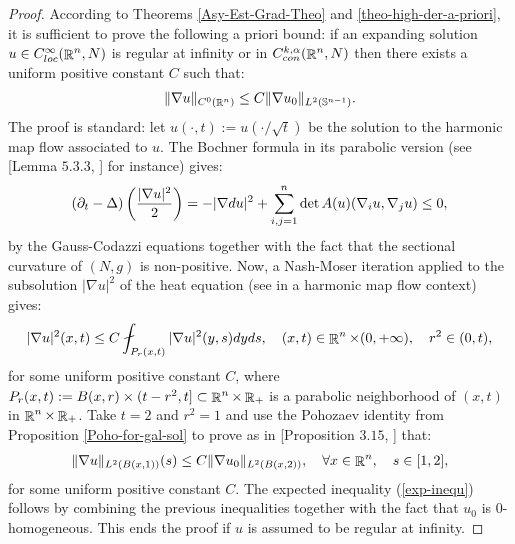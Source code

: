 \documentclass[a4paper,11pt,reqno]{amsart}
\newtheorem{rk}[defn]{Remark}
\def\det{\mathop{\rm det}\nolimits}
\def\det{\mathop{\rm det}\nolimits}
\def\R{\mathop{\rm \mathbb{R}}\nolimits}
\newcommand{\Sp}{\mathbb{S}}
\begin{document}


\begin{proof}
According to Theorems \ref{Asy-Est-Grad-Theo} and \ref{theo-high-der-a-priori}, it is sufficient to prove the following a priori bound: if an expanding solution $u\in C^{\infty}_{loc}(\R^n,N)$ is regular at infinity or in $C^{k,\alpha}_{con}(\R^n,N)$ then there exists a uniform positive constant $C$ such that:
\begin{eqnarray}
\|\nabla u\|_{C^0(\R^n)}\leq C\|\nabla u_0\|_{L^2(\Sp^{n-1})}.\label{exp-inequ}
\end{eqnarray}
The proof is standard: let $u(\cdot,t):=u(\cdot/\sqrt{t})$ be the solution to the harmonic map flow associated to $u$. The Bochner formula in its parabolic version (see [Lemma $5.3.3$, \cite{Lin-Wang-Boo}] for instance) gives:
\begin{eqnarray*}
(\partial_t-\Delta)\left(\frac{|\nabla u|^2}{2}\right)=-|\nabla du|^2+\sum_{i,j=1}^n\det A(u)(\nabla_iu,\nabla_ju)\leq0,
\end{eqnarray*}
by the Gauss-Codazzi equations together with the fact that the sectional curvature of $(N,g)$ is non-positive.  Now, a Nash-Moser iteration applied to the subsolution $|\nabla u|^2$ of the heat equation (see \cite{Str-Har-Map} in a harmonic map flow context) gives:
\begin{eqnarray*}
|\nabla u|^2(x,t)\leq C\fint_{P_r(x,t)}|\nabla u|^2(y,s)dyds,\quad (x,t)\in\R^n\times(0,+\infty), \quad r^2\in(0,t),
\end{eqnarray*}
for some uniform positive constant $C$, where $P_r(x,t):=B(x,r)\times(t-r^2,t]\subset\R^n\times\R_+$ is a parabolic neighborhood of $(x,t)$ in $\R^n\times\R_+$. Take $t=2$ and $r^2=1$ and use the Pohozaev identity from Proposition \ref{Poho-for-gal-sol} to prove as in [Proposition $3.15$, \cite{Der-Lam-HMF}] that:
\begin{eqnarray*}
\|\nabla u\|_{L^2(B(x,1))}(s)\leq C\|\nabla u_0\|_{L^2(B(x,2))},\quad \forall x\in\R^n,\quad s\in[1,2],
\end{eqnarray*}
for some uniform positive constant $C$. The expected inequality (\ref{exp-inequ}) follows by combining the previous inequalities together with the fact that $u_0$ is $0$-homogeneous. This ends the proof if $u$ is assumed to be regular at infinity.


\end{proof}
\end{document}
